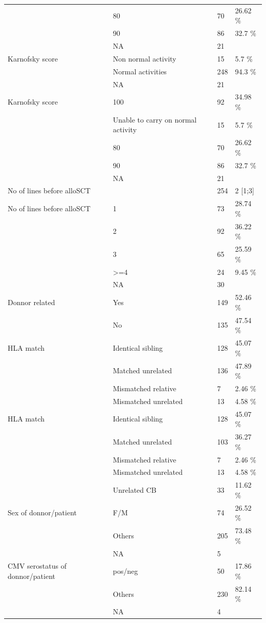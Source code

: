 \documentclass[a4paper,11pt] {article}
\begin{document}
\begin{longtable}{llll}
   & 80 & 70 & 26.62 \% \\ 
   & 90 & 86 & 32.7 \% \\ 
   & NA & 21 &  \\ 
  Karnofsky score & Non normal activity & 15 & 5.7 \% \\ 
   & Normal activities & 248 & 94.3 \% \\ 
   & NA & 21 &  \\ 
  Karnofsky score & 100 & 92 & 34.98 \% \\ 
   & Unable to carry on normal activity & 15 & 5.7 \% \\ 
   & 80 & 70 & 26.62 \% \\ 
   & 90 & 86 & 32.7 \% \\ 
   & NA & 21 &  \\ 
  No of lines before alloSCT &  & 254 & 2 [1;3] \\ 
  No of lines before alloSCT & 1 & 73 & 28.74 \% \\ 
   & 2 & 92 & 36.22 \% \\ 
   & 3 & 65 & 25.59 \% \\ 
   & >=4 & 24 & 9.45 \% \\ 
   & NA & 30 &  \\ 
  Donnor related & Yes & 149 & 52.46 \% \\ 
   & No & 135 & 47.54 \% \\ 
  HLA match & Identical sibling & 128 & 45.07 \% \\ 
   & Matched unrelated & 136 & 47.89 \% \\ 
   & Mismatched relative & 7 & 2.46 \% \\ 
   & Mismatched unrelated & 13 & 4.58 \% \\ 
  HLA match & Identical sibling & 128 & 45.07 \% \\ 
   & Matched unrelated & 103 & 36.27 \% \\ 
   & Mismatched relative & 7 & 2.46 \% \\ 
   & Mismatched unrelated & 13 & 4.58 \% \\ 
   & Unrelated CB & 33 & 11.62 \% \\ 
  Sex of donnor/patient & F/M & 74 & 26.52 \% \\ 
   & Others & 205 & 73.48 \% \\ 
   & NA & 5 &  \\ 
  CMV serostatus of donnor/patient & pos/neg & 50 & 17.86 \% \\ 
   & Others & 230 & 82.14 \% \\ 
   & NA & 4 &  \\ 

\end{longtable}
\end{document}
